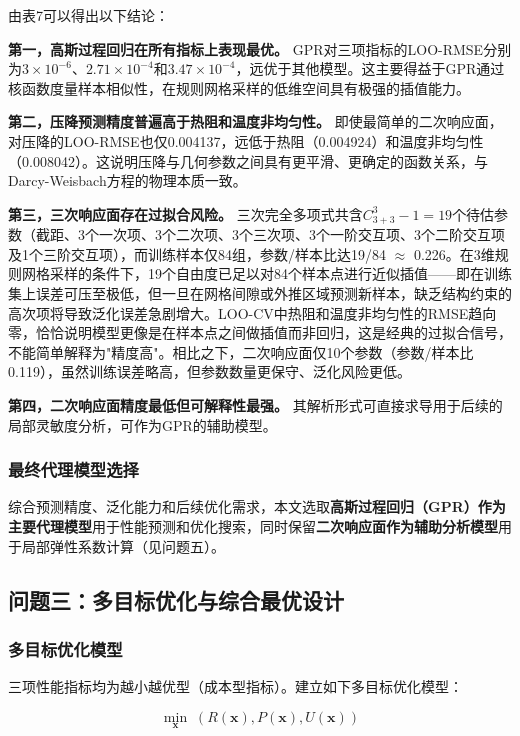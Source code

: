 \documentclass[12pt,a4paper]{ctexart}
\begin{document}
由表7可以得出以下结论：

\textbf{第一，高斯过程回归在所有指标上表现最优。} GPR对三项指标的LOO-RMSE分别为$3\times10^{-6}$、$2.71\times10^{-4}$和$3.47\times10^{-4}$，远优于其他模型。这主要得益于GPR通过核函数度量样本相似性，在规则网格采样的低维空间具有极强的插值能力。

\textbf{第二，压降预测精度普遍高于热阻和温度非均匀性。} 即使最简单的二次响应面，对压降的LOO-RMSE也仅0.004137，远低于热阻（0.004924）和温度非均匀性（0.008042）。这说明压降与几何参数之间具有更平滑、更确定的函数关系，与Darcy-Weisbach方程的物理本质一致。

\textbf{第三，三次响应面存在过拟合风险。} 三次完全多项式共含$C_{3+3}^{3}-1=19$个待估参数（截距、3个一次项、3个二次项、3个三次项、3个一阶交互项、3个二阶交互项及1个三阶交互项），而训练样本仅84组，参数/样本比达19/84 $\approx$ 0.226。在3维规则网格采样的条件下，19个自由度已足以对84个样本点进行近似插值——即在训练集上误差可压至极低，但一旦在网格间隙或外推区域预测新样本，缺乏结构约束的高次项将导致泛化误差急剧增大。LOO-CV中热阻和温度非均匀性的RMSE趋向零，恰恰说明模型更像是在样本点之间做插值而非回归，这是经典的过拟合信号，不能简单解释为"精度高"。相比之下，二次响应面仅10个参数（参数/样本比0.119），虽然训练误差略高，但参数数量更保守、泛化风险更低。

\textbf{第四，二次响应面精度最低但可解释性最强。} 其解析形式可直接求导用于后续的局部灵敏度分析，可作为GPR的辅助模型。

\subsubsection{最终代理模型选择}

综合预测精度、泛化能力和后续优化需求，本文选取\textbf{高斯过程回归（GPR）作为主要代理模型}用于性能预测和优化搜索，同时保留\textbf{二次响应面作为辅助分析模型}用于局部弹性系数计算（见问题五）。

\subsection{问题三：多目标优化与综合最优设计}

\subsubsection{多目标优化模型}

三项性能指标均为越小越优型（成本型指标）。建立如下多目标优化模型：

\begin{equation}
\min_{\boldsymbol{x}} \; (R(\boldsymbol{x}), P(\boldsymbol{x}), U(\boldsymbol{x}))
\end{equation}
\end{document}
